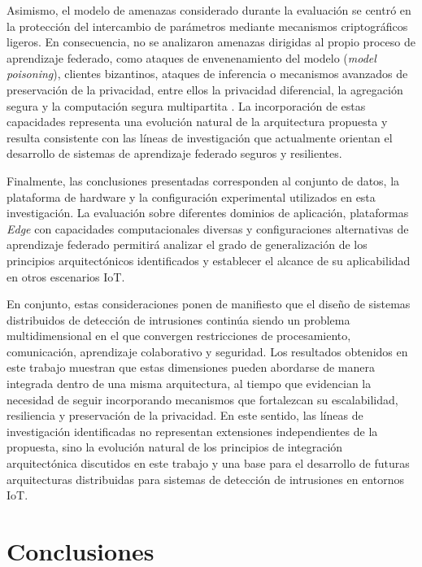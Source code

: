 \documentclass[journal,article,submit,moreauthors]{Definitions/mdpi}
\begin{document}
Asimismo, el modelo de amenazas considerado durante la evaluación se centró en la protección del intercambio de parámetros mediante mecanismos criptográficos ligeros. En consecuencia, no se analizaron amenazas dirigidas al propio proceso de aprendizaje federado, como ataques de envenenamiento del modelo (\textit{model poisoning}), clientes bizantinos, ataques de inferencia o mecanismos avanzados de preservación de la privacidad, entre ellos la privacidad diferencial, la agregación segura y la computación segura multipartita \cite{Bunko2026}. La incorporación de estas capacidades representa una evolución natural de la arquitectura propuesta y resulta consistente con las líneas de investigación que actualmente orientan el desarrollo de sistemas de aprendizaje federado seguros y resilientes.

Finalmente, las conclusiones presentadas corresponden al conjunto de datos, la plataforma de hardware y la configuración experimental utilizados en esta investigación. La evaluación sobre diferentes dominios de aplicación, plataformas \textit{Edge} con capacidades computacionales diversas y configuraciones alternativas de aprendizaje federado permitirá analizar el grado de generalización de los principios arquitectónicos identificados y establecer el alcance de su aplicabilidad en otros escenarios IoT.

En conjunto, estas consideraciones ponen de manifiesto que el diseño de sistemas distribuidos de detección de intrusiones continúa siendo un problema multidimensional en el que convergen restricciones de procesamiento, comunicación, aprendizaje colaborativo y seguridad. Los resultados obtenidos en este trabajo muestran que estas dimensiones pueden abordarse de manera integrada dentro de una misma arquitectura, al tiempo que evidencian la necesidad de seguir incorporando mecanismos que fortalezcan su escalabilidad, resiliencia y preservación de la privacidad. En este sentido, las líneas de investigación identificadas no representan extensiones independientes de la propuesta, sino la evolución natural de los principios de integración arquitectónica discutidos en este trabajo y una base para el desarrollo de futuras arquitecturas distribuidas para sistemas de detección de intrusiones en entornos IoT.

\section{Conclusiones}
\end{document}
